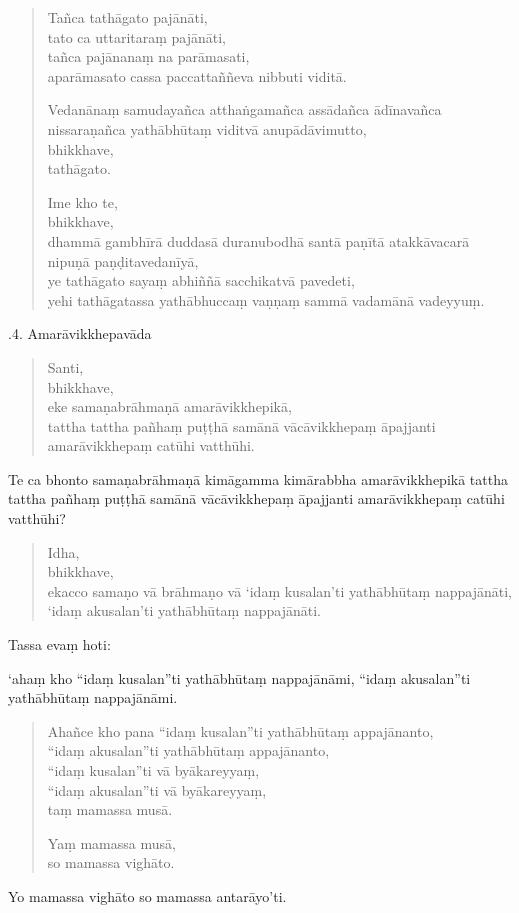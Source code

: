 \documentclass[11pt,twoside,openright]{book}
\begin{document}
\begin{verse}
Tañca tathāgato pajānāti,\\
\vin  tato ca uttaritaraṃ pajānāti,\\
\vin  tañca pajānanaṃ na parāmasati,\\
\vin  aparāmasato cassa paccattaññeva nibbuti viditā.

Vedanānaṃ samudayañca atthaṅgamañca assādañca ādīnavañca nissaraṇañca yathābhūtaṃ viditvā anupādāvimutto,\\
\vin  bhikkhave,\\
\vin  tathāgato.

Ime kho te,\\
\vin  bhikkhave,\\
\vin  dhammā gambhīrā duddasā duranubodhā santā paṇītā atakkāvacarā nipuṇā paṇḍitavedanīyā,\\
\vin  ye tathāgato sayaṃ abhiññā sacchikatvā pavedeti,\\
\vin  yehi tathāgatassa yathābhuccaṃ vaṇṇaṃ sammā vadamānā vadeyyuṃ.

\end{verse}
.4. Amarāvikkhepavāda
\pend

\begin{verse}
Santi,\\
\vin  bhikkhave,\\
\vin  eke samaṇabrāhmaṇā amarāvikkhepikā,\\
\vin  tattha tattha pañhaṃ puṭṭhā samānā vācāvikkhepaṃ āpajjanti amarāvikkhepaṃ catūhi vatthūhi.

\end{verse}
\pstart
Te ca bhonto samaṇabrāhmaṇā kimāgamma kimārabbha amarāvikkhepikā tattha tattha pañhaṃ puṭṭhā samānā vācāvikkhepaṃ āpajjanti amarāvikkhepaṃ catūhi vatthūhi?
\pend

\begin{verse}
Idha,\\
\vin  bhikkhave,\\
\vin  ekacco samaṇo vā brāhmaṇo vā ‘idaṃ kusalan’ti yathābhūtaṃ nappajānāti,\\
\vin  ‘idaṃ akusalan’ti yathābhūtaṃ nappajānāti.

\end{verse}
\pstart
Tassa evaṃ hoti:
\pend

\pstart
‘ahaṃ kho “idaṃ kusalan”ti yathābhūtaṃ nappajānāmi, “idaṃ akusalan”ti yathābhūtaṃ nappajānāmi.
\pend

\begin{verse}
Ahañce kho pana “idaṃ kusalan”ti yathābhūtaṃ appajānanto,\\
\vin  “idaṃ akusalan”ti yathābhūtaṃ appajānanto,\\
\vin  “idaṃ kusalan”ti vā byākareyyaṃ,\\
\vin  “idaṃ akusalan”ti vā byākareyyaṃ,\\
\vin  taṃ mamassa musā.

Yaṃ mamassa musā,\\
\vin  so mamassa vighāto.

\end{verse}
\pstart
Yo mamassa vighāto so mamassa antarāyo’ti.
\pend
\end{document}
